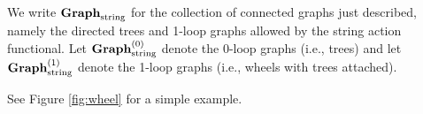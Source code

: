 We write ${\bf Graph}_{\rm string}$ for the collection of connected graphs just described,
namely the directed trees and 1-loop graphs allowed by the string action functional.
Let ${\bf Graph}_{\rm string}^{(0)}$ denote the 0-loop graphs (i.e., trees) and let ${\bf Graph}_{\rm string}^{(1)}$ denote the 1-loop graphs (i.e., wheels with trees attached).

See Figure \ref{fig:wheel} for a simple example.




%

